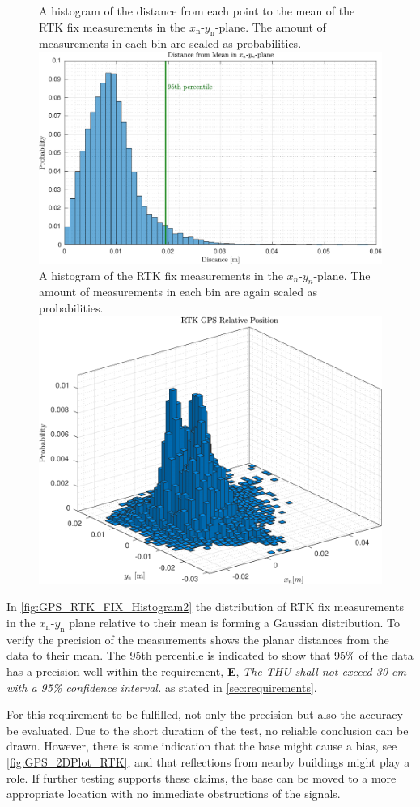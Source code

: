 \begin{figure}[H]
  \captionbox
  {
    A histogram of the distance from each point to the mean of the RTK fix measurements in the $x_\mathrm{n}$-$y_\mathrm{n}$-plane. The amount of measurements in each bin are scaled as probabilities.
    \label{fig:GPS_RTK_FIX_Histogram}
  }
  {
    \includegraphics[width=.50\textwidth]{figures/GPS_RTK_Fix_Histogram}
  }
  \hspace{5pt}
  \captionbox
  {
    A histogram of the RTK fix measurements in the $x_n$-$y_n$-plane. The amount of measurements in each bin are again scaled as probabilities.
    \label{fig:GPS_RTK_FIX_Histogram2}
  }
  {
    \includegraphics[width=.43\textwidth]{figures/GPS_RTK_Fix_Histogram2}
  }
\end{figure}

In \autoref{fig:GPS_RTK_FIX_Histogram2} the distribution of RTK fix measurements in the $x_\mathrm{n}$-$y_\mathrm{n}$ plane relative to their mean is forming a Gaussian distribution. To verify the precision of the measurements shows the planar distances from the data to their mean. The 95th percentile is indicated to show that 95$\%$ of the data has a precision well within the requirement, \textbf{E}, \emph{The THU shall not exceed 30 cm with a 95\% confidence interval.} as stated in \autoref{sec:requirements}.

For this requirement to be fulfilled, not only the precision but also the accuracy be evaluated. Due to the short duration of the test, no reliable conclusion can be drawn. However, there is some indication that the base might cause a bias, see \autoref{fig:GPS_2DPlot_RTK}, and that reflections from nearby buildings might play a role. If further testing supports these claims, the base can be moved to a more appropriate location with no immediate obstructions of the signals.


